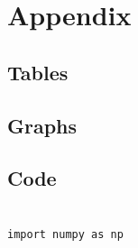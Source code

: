\documentclass[12pt]{article}
\begin{document}
\newpage



 \label{sec:ref}

\vspace{1.5cm}

\listoffigures

\listoftables

\section*{Appendix} \label{sec:A}

\subsection*{Tables}



\subsection*{Graphs}



\subsection*{Code}

%

\begin{minipage}{\linewidth}
\captionsetup{hypcap=false}

\begin{mintedbox}
\begin{verbatim}

import numpy as np

\end{verbatim}
\end{mintedbox}

\end{minipage}
\end{document}
